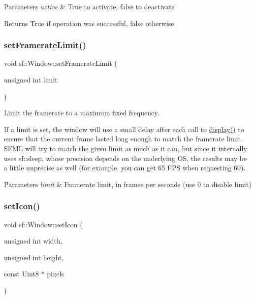 \begin{DoxyParams}{Parameters}
{\em active} & True to activate, false to deactivate\\
\hline
\end{DoxyParams}
\begin{DoxyReturn}{Returns}
True if operation was successful, false otherwise 
\end{DoxyReturn}
\mbox{\label{classsf_1_1_window_af4322d315baf93405bf0d5087ad5e784}} 
\subsubsection{\texorpdfstring{set\+Framerate\+Limit()}{setFramerateLimit()}}
{\footnotesize\ttfamily void sf\+::\+Window\+::set\+Framerate\+Limit (\begin{DoxyParamCaption}\item[{unsigned int}]{limit }\end{DoxyParamCaption})}



Limit the framerate to a maximum fixed frequency. 

If a limit is set, the window will use a small delay after each call to \hyperlink{classsf_1_1_window_adabf839cb103ac96cfc82f781638772a}{display()} to ensure that the current frame lasted long enough to match the framerate limit. S\+F\+ML will try to match the given limit as much as it can, but since it internally uses sf\+::sleep, whose precision depends on the underlying OS, the results may be a little unprecise as well (for example, you can get 65 F\+PS when requesting 60).


\begin{DoxyParams}{Parameters}
{\em limit} & Framerate limit, in frames per seconds (use 0 to disable limit) \\
\hline
\end{DoxyParams}
\mbox{\label{classsf_1_1_window_a63af61e026fba08e3153fd013620bcc0}} 
\subsubsection{\texorpdfstring{set\+Icon()}{setIcon()}}
{\footnotesize\ttfamily void sf\+::\+Window\+::set\+Icon (\begin{DoxyParamCaption}\item[{unsigned int}]{width,  }\item[{unsigned int}]{height,  }\item[{const Uint8 $\ast$}]{pixels }\end{DoxyParamCaption})}



